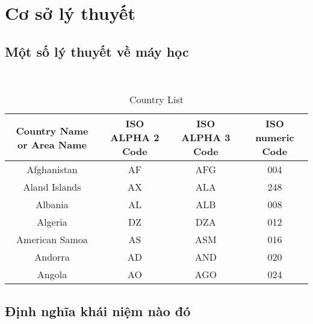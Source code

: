 \chapter{Cơ sở lý thuyết}
\section{Một số lý thuyết về máy học}

\blindtext
\blindtext \\

\begin{table}[!h]
\begin{center}
\caption{Country List}
\label{tab:country-list}
\begin{tabular}{||c c c c||} 
 \hline
 Country Name or Area Name& ISO ALPHA 2 Code &ISO ALPHA 3 Code&ISO numeric Code\\
     \hline
     Afghanistan   & AF    &AFG&   004\\
     Aland Islands&   AX  & ALA   &248\\
     Albania &AL & ALB&  008\\
     Algeria    &DZ & DZA&  012\\
     American Samoa&   AS  & ASM&016\\
     Andorra& AD  & AND   &020\\
     Angola& AO  & AGO&024\\
 \hline
\end{tabular}

\end{center}
\end{table}


\blindtext


\section{Định nghĩa khái niệm nào đó}
\blindtext
\blindtext


